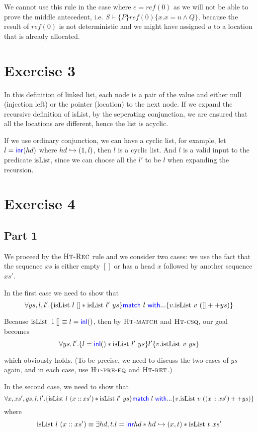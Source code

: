 \documentclass{article}
\begin{document}
We cannot use this rule in the case where $e=ref(0)$ as we will
not be able to prove the middle antecedent, i.e.
$S \vdash \{P\} ref(0) \{x.x=u \wedge Q\} $, because the result
of $ref(0)$ is not deterministic and we might have assigned $u$
to a location that is already allocated.

\section*{Exercise 3}

In this definition of linked list, each node is a pair of the value
and either null (injection left) or the pointer (location) to the next node.
If we expand the recursive definition of isList, by the seperating
conjunction, we are ensured that all the locations are different, hence
the list is acyclic.

If we use ordinary conjunction, we can have a cyclic list, for example,
let $l = \textsf{\color{blue} inr} (hd)$ where $hd \hookrightarrow (1, l)$, then $l$ is a cyclic list.
And $l$ is a valid input to the predicate $\text{isList}$, since we can choose
all the $l'$ to be $l$ when expanding the recursion.

\section*{Exercise 4}

\subsection*{Part 1}

We proceed by the $\textsc{Ht-Rec}$ rule and we consider two cases:
we use the fact that the sequence $xs$ is either empty $[]$ or
has a head $x$ followed by another sequence $xs'$.

In the first case we need to show that
$$
    \forall ys, l, l'. \{\text{isList} \ l \ [] \ast \text{isList} \ l' \ ys\}
    \textsf{\color{blue} match} \ l \ \textsf{\color{blue} with} ... \{v. \text{isList} \ v \ ([] ++ ys)\}
$$

Because $\text{isList \ l []} \equiv l = \textsf{\color{blue} inl} ()$, then by $\textsc{Ht-match}$
and $\textsc{Ht-csq}$, our goal becomes
$$
    \forall ys, l'. \{l = \textsf{\color{blue} inl} () \ast \text{isList} \ l' \ ys\} l' \{v. \text{istList} \ v \ ys\}
$$

which obviously holds. (To be precise, we need to discuss the two cases of $ys$
again, and in each case, use $\textsc{Ht-pre-eq}$ and $\textsc{Ht-ret}$.)

In the second case, we need to show that
$$
    \forall x, xs', ys, l, l'. \{\text{isList} \ l \ (x :: xs') \star \text{isList} \ l' \ ys\}
    \langkw{match} \ l \ \langkw{with} ... \{v. \text{isList} \ v \ ((x :: xs') ++ ys)\}
$$
where
$$
    \text{isList} \ l \ (x :: xs') \equiv \exists hd, t. l=\textsf{\color{blue} inr} hd * hd \hookrightarrow (x, t) * \text{isList} \ t \ xs'
$$
\end{document}
